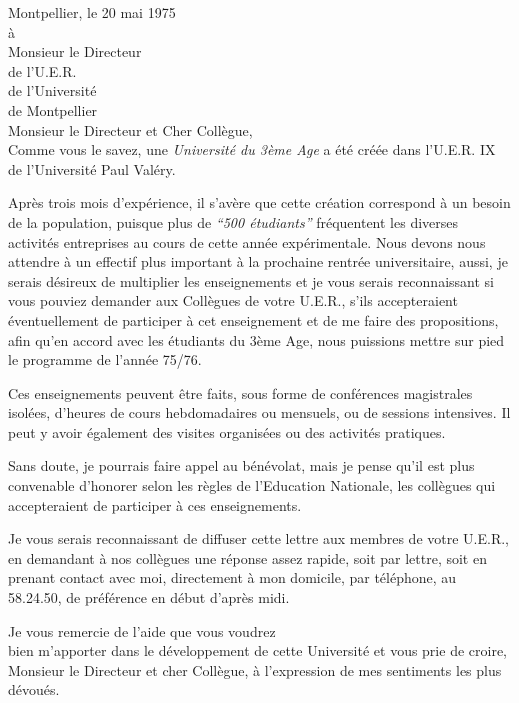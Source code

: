 Montpellier, le 20 mai 1975\\

à\\
Monsieur le Directeur\\
de l'U.E.R.\\
de l'Université\\
de Montpellier\\

Monsieur le Directeur et Cher Collègue,\\

Comme vous le savez, une \textit{Université du 3ème Age} a été créée dans l'U.E.R. IX de l'Université Paul Valéry.

Après trois mois d'expérience, il s'avère que cette création correspond à un besoin de la population, puisque plus de \textit{``500 étudiants''} fréquentent les diverses activités entreprises au cours de cette année expérimentale. Nous devons nous attendre à un effectif plus important à la prochaine rentrée universitaire, aussi, je serais désireux de multiplier les enseignements et je vous serais reconnaissant si vous pouviez demander aux Collègues de votre U.E.R., s'ils accepteraient éventuellement de participer à cet enseignement et de me faire des propositions, afin qu'en accord avec les étudiants du 3ème Age, nous puissions mettre sur pied le programme de l'année 75/76.

Ces enseignements peuvent être faits, sous forme de conférences magistrales isolées, d'heures de cours hebdomadaires ou mensuels, ou de sessions intensives. Il peut y avoir également des visites organisées ou des activités pratiques.

Sans doute, je pourrais faire appel au bénévolat, mais je pense qu'il est plus convenable d'honorer selon les règles de l'Education Nationale, les collègues qui accepteraient de participer à ces enseignements.

Je vous serais reconnaissant de diffuser cette lettre aux membres de votre U.E.R., en demandant à nos collègues une réponse assez rapide, soit par lettre, soit en prenant contact avec moi, directement à mon domicile, par téléphone, au 58.24.50, de préférence en début d'après midi.

Je vous remercie de l'aide que vous voudrez\\
bien m'apporter dans le développement de cette Université et vous prie de croire,\\
Monsieur le Directeur et cher Collègue, à l'expression de mes sentiments les plus\\
dévoués.\\

